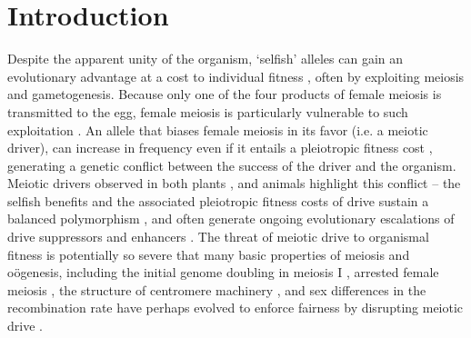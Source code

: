 \documentclass[12pt,letterpaper]{article}
\begin{document}
\section*{Introduction}
Despite the apparent unity of the organism, `selfish' alleles can
gain an evolutionary advantage at a cost to  individual fitness
\citep{Burt2006}, often by exploiting meiosis and gametogenesis.
Because only one of the four products of female meiosis is transmitted to the egg, female meiosis is particularly vulnerable to such exploitation \citep{Sandler1957,Pardo-ManuelDeVillena2001a}. 
An allele that biases female meiosis in its favor (i.e. a meiotic driver), can increase in frequency even if it entails a pleiotropic fitness cost \citep{Prout1973}, generating a genetic conflict between the success of the driver and the organism.
Meiotic drivers observed in both plants
\citep{Buckler1999,Fishman2005,Fishman2008}, and animals
\citep{Agulnik1990,Wu2005,Pardo-ManuelDeVillena2001c} highlight this
conflict -- the selfish benefits and the associated
pleiotropic fitness costs of drive sustain a balanced polymorphism
\citep{Prout1973}, 
and often generate ongoing evolutionary escalations of drive suppressors and enhancers \citep{Dawe1996,Fishman2008}. 
The threat of meiotic drive to organismal fitness is potentially so
severe that many basic properties of
meiosis and o\"{o}genesis, including the initial genome doubling in
meiosis I \citep{Haig1991}, arrested female meiosis
\citep{Mira1998}, the structure of centromere machinery \citep{Malik2002a,Malik2009}, and sex differences in the recombination rate \citep{Haig2010,Brandvain2012} 
have perhaps evolved to enforce fairness by disrupting meiotic drive \citep{Rice2013}. \newline 
\end{document}
